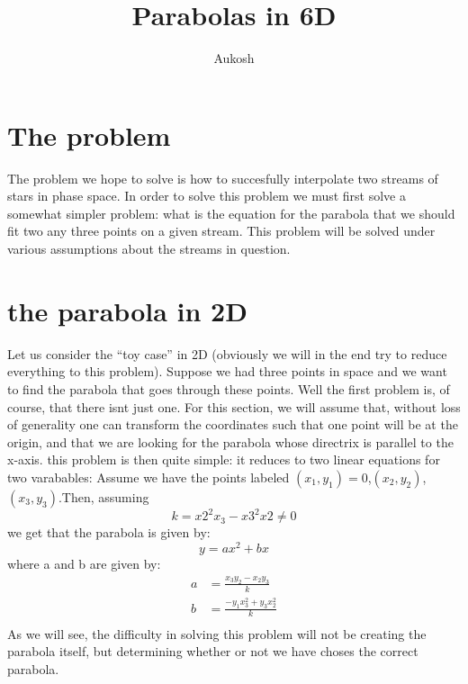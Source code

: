 \documentclass{article}
\begin{document}
\title{Parabolas in 6D}
\author{Aukosh}
\maketitle

\section{The problem}
The problem we hope to solve is how to succesfully interpolate two streams of stars in phase space. In order to solve this problem we must first solve a somewhat simpler problem: what is the equation for the parabola that we should fit two any three points on a given stream. This problem will be solved under various assumptions about the streams in question.

\section{the parabola in 2D}
Let us consider the ``toy case'' in 2D (obviously we will in the end try to reduce everything to this problem). Suppose we had three points in space and we want to find the parabola that goes through these points. Well the first problem is, of course, that there isnt just one. For this section, we will assume that, without loss of generality one can transform the coordinates such that one point will be at the origin, and that we are looking for the parabola whose directrix is parallel to the x-axis. this problem is then quite simple: it reduces to two linear equations for two varabables: Assume we have the points labeled $(x_1,y_1)=0$,$(x_2,y_2)$,$(x_3,y_3)$.Then, assuming
\begin{equation}
k = x2^2x_3-x3^2x2 \neq 0
\end{equation}
we get that the parabola is given by:
\begin{equation}
y = ax^2 +bx
\end{equation}
where a and b are given by:
\begin{subequations}
\begin{align}
a &= \frac{x_3y_2-x_2y_3}{k}\\
b &= \frac{-y_1x_3^2+y_3x_2^2}{k}\\
\end{align}
\end{subequations}
As we will see, the difficulty in solving this problem will not be creating the parabola itself, but determining whether or not we have choses the correct parabola. 
\end{document}
